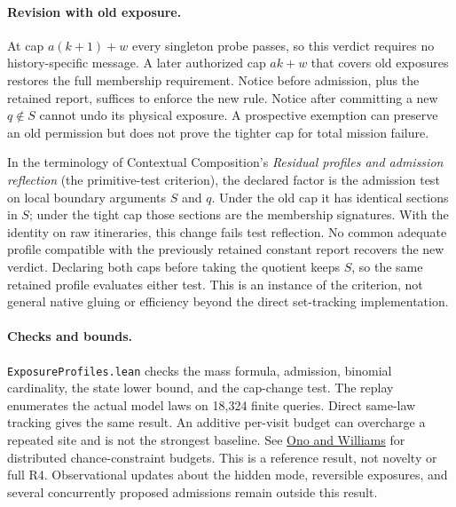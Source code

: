 \documentclass[11pt]{article}
\begin{document}
\paragraph{Revision with old exposure.}
At cap \(a(k+1)+w\) every singleton probe passes, so this verdict
requires no history-specific message. A later authorized cap \(ak+w\)
that covers old exposures restores the full membership requirement.
Notice before admission, plus the retained report, suffices to enforce
the new rule. Notice after committing a new \(q\notin S\) cannot
undo its physical exposure. A prospective exemption can preserve an old
permission but does not prove the tighter cap for total mission failure.

In the terminology of Contextual Composition's
\emph{Residual profiles and admission reflection} (the primitive-test
criterion), the declared factor is the admission test on local boundary
arguments \(S\) and \(q\). Under the old cap it has identical sections in
\(S\); under the tight cap those sections are the membership signatures.
With the identity on raw itineraries, this change fails test reflection.
No common adequate profile compatible with the previously retained constant
report recovers the new verdict. Declaring both caps before taking the
quotient keeps \(S\), so the same retained profile evaluates either
test. This is an instance of the criterion, not general native gluing
or efficiency beyond the direct set-tracking implementation.

\paragraph{Checks and bounds.}
\texttt{ExposureProfiles.lean} checks the mass formula, admission,
binomial cardinality, the state lower bound, and the cap-change test.
The replay enumerates the actual model laws on 18,324 finite queries.
Direct same-law tracking gives the same result. An additive per-visit
budget can overcharge a repeated site and is not the strongest baseline.
See \href{https://groups.csail.mit.edu/mers/papers/Ono-Williams_AAMAS10.pdf}{Ono and Williams}
for distributed chance-constraint budgets. This is a reference result,
not novelty or full R4. Observational updates about the hidden mode,
reversible exposures, and several concurrently proposed admissions
remain outside this result.
\end{document}

